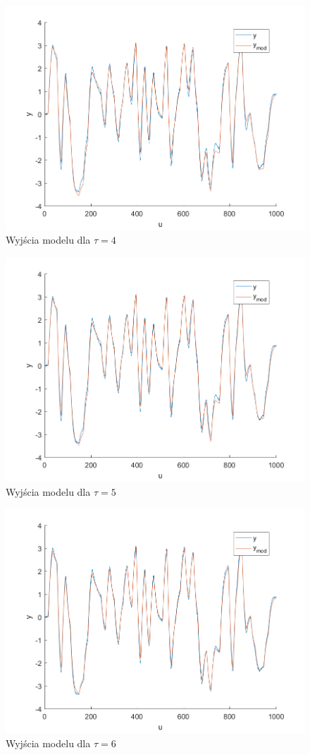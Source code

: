 \documentclass[a4paper, 10pt]{article}
\begin{document}
	\begin{figure}[H]
	\centering
	\includegraphics[width=0.9\linewidth]{z1_4}
	\caption{Wyjścia modelu dla $\tau=4$}
	\label{fig:z1_4}
	\end{figure}
	\begin{figure}[H]
	\centering
	\includegraphics[width=0.9\linewidth]{z1_5}
	\caption{Wyjścia modelu dla $\tau=5$}
	\label{fig:z1_5}
	\end{figure}
	\begin{figure}[H]
	\centering
	\includegraphics[width=0.9\linewidth]{z1_6}
	\caption{Wyjścia modelu dla $\tau=6$}
	\label{fig:z1_6}
	\end{figure}
\end{document}
